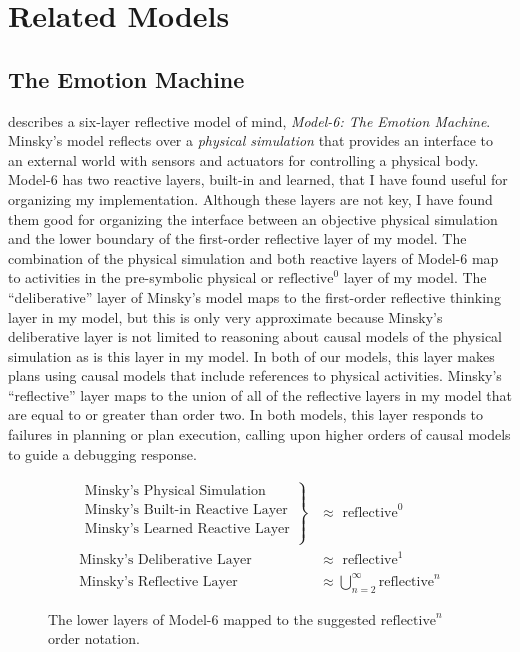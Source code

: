 \chapter{Related Models}
\label{chapter:related_models}

\section{The Emotion Machine}
\label{backreference:self_reflective_self_conscious}

\cite{minsky:2006} describes a six-layer reflective model of mind,
\emph{{\mbox{Model-6}}: The Emotion Machine}.  Minsky's model reflects
over a \emph{physical simulation} that provides an interface to an
external world with sensors and actuators for controlling a physical
body.  {\mbox{Model-6}} has two reactive layers, built-in and learned,
that I have found useful for organizing my implementation.  Although
these layers are not key, I have found them good for organizing the
interface between an objective physical simulation and the lower
boundary of the first-order reflective layer of my model.  The
combination of the physical simulation and both reactive layers of
{\mbox{Model-6}} map to activities in the pre-symbolic physical or
$\text{reflective}^0$ layer of my model.  The ``deliberative'' layer
of Minsky's model maps to the first-order reflective thinking layer in
my model, but this is only very approximate because Minsky's
deliberative layer is not limited to reasoning about causal models of
the physical simulation as is this layer in my model.  In both of our
models, this layer makes plans using causal models that include
references to physical activities.  Minsky's ``reflective'' layer maps
to the union of all of the reflective layers in my model that are
equal to or greater than order two.  In both models, this layer
responds to failures in planning or plan execution, calling upon
higher orders of causal models to guide a debugging response.

\begin{figure}[bth]
\begin{align*}
\left.
  \begin{array}{l}
    \text{Minsky's Physical Simulation}\\
    \text{Minsky's Built-in Reactive Layer}\\
    \text{Minsky's Learned Reactive Layer}\\
  \end{array}
\right\}                            &{\approx} \text{ reflective}^0 \\
\text{Minsky's Deliberative Layer } &{\approx} \text{ reflective}^1 \\
\text{Minsky's Reflective Layer }   &{\approx} \bigcup_{n=2}^{\infty}{\text{reflective}^n}
\end{align*}
\caption{The lower layers of Model-6 mapped to the suggested
  $\text{reflective}^n$ order notation.}
\label{figure:model_6_as_reflective_order_notation}
\end{figure}

